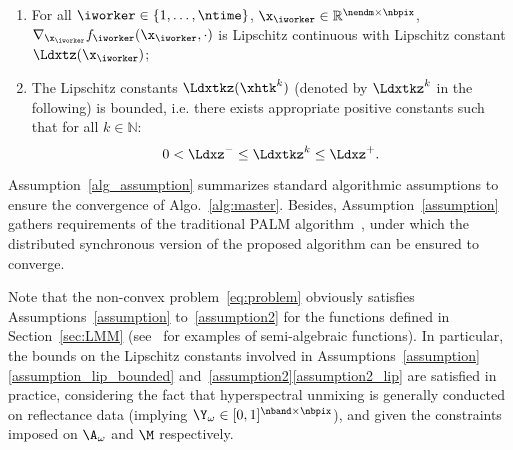 \documentclass[journal,final,letterpaper,twoside,twocolumn]{IEEEtran}
\begin{document}
\begin{assumption} \label{assumption2}
    \begin{enumerate}[label=(\roman*)]
        \item For all $\iworker \in \{1, \dotsc, \ntime\}$, $\x_\iworker \in \mathbb{R}^{\nendm \times \nbpix}$,  $\nabla_{\x_\iworker} f_\iworker(\x_\iworker,\cdot)$ is Lipschitz continuous with Lipschitz constant $\Ldxtz(\x_\iworker)$;
        \item The Lipschitz constants $\Ldxtkz(\xhtk^k)$ (denoted by $\Ldxtkz^k$ in the following) is bounded, i.e. there exists appropriate positive constants such that for all $k \in \mathbb{N}$:\label{assumption2_lip}
            \begin{equation*}
            0 < \Ldxz^- \leq \Ldxtkz^k \leq \Ldxz^+.
            \end{equation*}
    \end{enumerate}
\end{assumption}

Assumption~\ref{alg_assumption} summarizes standard algorithmic assumptions to ensure the convergence of Algo.~\ref{alg:master}. Besides, Assumption~\ref{assumption} gathers requirements of the traditional PALM algorithm~\cite{Bolte2013}, under which the distributed synchronous version of the proposed algorithm can be ensured to converge.

Note that the non-convex problem~\eqref{eq:problem} obviously satisfies Assumptions~\ref{assumption} to~\ref{assumption2} for the functions defined in Section~\ref{sec:LMM} (see~\cite{Bolte2013} for examples of semi-algebraic functions). In particular, the bounds on the Lipschitz constants involved in Assumptions~\ref{assumption}\ref{assumption_lip_bounded} and~\ref{assumption2}\ref{assumption2_lip} are satisfied in practice, considering the fact that hyperspectral unmixing is generally conducted on reflectance data (implying $\Y_\omega \in [0, 1]^{\nband \times \nbpix}$), and given the constraints imposed on $\A_\omega$ and $\M$ respectively.

\end{document}
